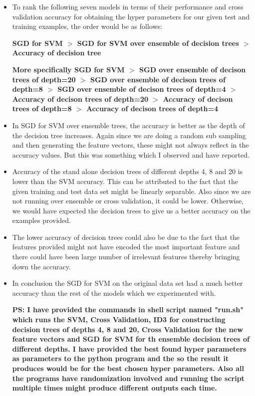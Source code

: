\documentclass[11pt]{article}
\begin{document}
\begin{itemize}
	\item To rank the following seven models in terms of their performance and cross validation accuracy for obtaining the hyper parameters for our given test and training examples, the order would be as follows:
	
	\textbf{SGD for SVM  $>$ SGD for SVM over ensemble of decision trees $>$ Accuracy of decision tree}
	
	\textbf{More specifically SGD for SVM  $>$ SGD over ensemble of decison trees of depth=20 $>$ SGD over ensemble of decison trees of depth=8 $>$ SGD over ensemble of decison trees of depth=4 $>$ Accuracy of decison trees of depth=20 $>$ Accuracy of decison trees of depth=8 $>$ Accuracy of decison trees of depth=4}
		
	\item In SGD for SVM over ensemble trees, the accuracy is better as the depth of the decision tree increases. Again since we are doing a random sub sampling and then generating the feature vectors, these might not always reflect in the accuracy values. But this was something which I observed and have reported.
	\item Accuracy of the stand alone decision trees of different depths 4, 8 and 20 is lower than the SVM accuracy. This can be attributed to the fact that the given training and test data set might be linearly separable. Also since we are not running over ensemble or cross validation, it could be lower. Otherwise, we would have expected the decision trees to give us a better accuracy on the examples provided.
	
	\item  The lower accuracy of decision trees could also be due to the fact that the features provided might not have encoded the most important feature and there could have been large number of irrelevant features thereby bringing down the accuracy.
	
	\item In conclusion the SGD for SVM on the original data set had a much better accuracy than the rest of the models which we experimented with.


\textbf{PS: I have provided the commands in shell script named "run.sh"  which runs the SVM, Cross Validation, ID3 for constructing decision trees of depths 4, 8 and 20, Cross Validation for the new feature vectors and SGD for SVM for th ensemble decision trees of different depths. I have provided the best found hyper parameters as parameters to the python program and the so the result it produces would be for the best chosen hyper parameters. Also all the programs have randomization involved and running the script multiple times might produce different outputs each time.}

\end{itemize}
\end{document}
